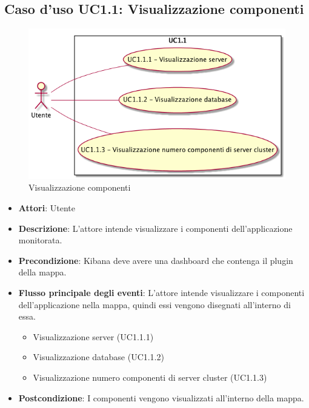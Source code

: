 \subsection{Caso d'uso UC1.1: Visualizzazione componenti}
\begin{figure} [H]
\centering
\includegraphics[scale=0.45]{./UC/UC1-1.png}
\caption{Visualizzazione componenti}\label{}
\end{figure}
\begin{itemize}
\item \textbf{Attori}: Utente
\item \textbf{Descrizione}: L'attore intende visualizzare i componenti dell'applicazione monitorata.
\item \textbf{Precondizione}: Kibana deve avere una dashboard che contenga il plugin della mappa.
\item \textbf{Flusso principale degli eventi}: L'attore intende visualizzare i componenti dell'applicazione nella mappa, quindi essi vengono disegnati all'interno di essa.
\begin{itemize}
\item Visualizzazione server (UC1.1.1)
\item Visualizzazione database (UC1.1.2)
\item Visualizzazione numero componenti di server cluster (UC1.1.3)
\end{itemize}
\item \textbf{Postcondizione}: I componenti vengono visualizzati all'interno della mappa.
\end{itemize}
